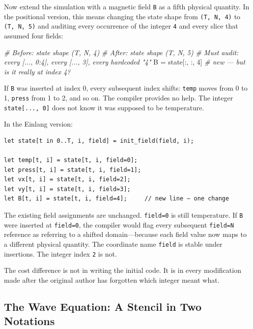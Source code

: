 \documentclass[11pt,titlepage]{article}
\newenvironment{Shaded}{}{}
\newcommand{\CommentTok}[1]{\textcolor[rgb]{0.38,0.63,0.69}{\textit{#1}}}
\newcommand{\DecValTok}[1]{\textcolor[rgb]{0.25,0.63,0.44}{#1}}
\newcommand{\NormalTok}[1]{#1}
\newcommand{\OperatorTok}[1]{\textcolor[rgb]{0.40,0.40,0.40}{#1}}
\begin{document}
Now extend the simulation with a magnetic field \texttt{B} as a fifth
physical quantity. In the positional version, this means changing the
state shape from \texttt{(T,\ N,\ 4)} to \texttt{(T,\ N,\ 5)} and
auditing every occurrence of the integer \texttt{4} and every slice that
assumed four fields:

\begin{Shaded}
\begin{Highlighting}[]
\CommentTok{# Before: state shape (T, N, 4)}
\CommentTok{# After:  state shape (T, N, 5)}
\CommentTok{# Must audit: every [..., 0:4], every [..., 3], every hardcoded "4"}
\NormalTok{B }\OperatorTok{=}\NormalTok{ state[:, :, }\DecValTok{4}\NormalTok{]  }\CommentTok{# new — but is it really at index 4?}
\end{Highlighting}
\end{Shaded}

If \texttt{B} was inserted at index 0, every subsequent index shifts:
\texttt{temp} moves from 0 to 1, \texttt{press} from 1 to 2, and so on.
The compiler provides no help. The integer \texttt{state{[}...,\ 0{]}}
does not know it was supposed to be temperature.

In the Einlang version:

\begin{verbatim}
let state[t in 0..T, i, field] = init_field(field, i);

let temp[t, i] = state[t, i, field=0];
let press[t, i] = state[t, i, field=1];
let vx[t, i] = state[t, i, field=2];
let vy[t, i] = state[t, i, field=3];
let B[t, i] = state[t, i, field=4];     // new line — one change
\end{verbatim}

The existing field assignments are unchanged. \texttt{field=0} is still
temperature. If \texttt{B} were inserted at \texttt{field=0}, the
compiler would flag every subsequent \texttt{field=N} reference as
referring to a shifted domain---because each field value now maps to a
different physical quantity. The coordinate name \texttt{field} is
stable under insertions. The integer index \texttt{2} is not.

The cost difference is not in writing the initial code. It is in every
modification made after the original author has forgotten which integer
meant what.

\vspace{2em}

\hypertarget{the-wave-equation-a-stencil-in-two-notations}{%
\subsection{The Wave Equation: A Stencil in Two
Notations}\label{the-wave-equation-a-stencil-in-two-notations}}
\end{document}
